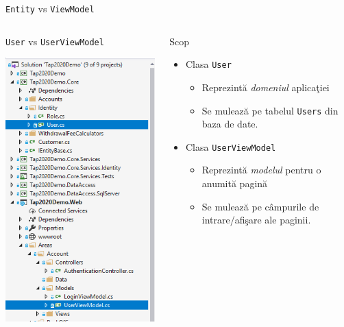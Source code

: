 \documentclass[presentation]{beamer}
\begin{document}
\begin{frame}[label={sec:org939da90},fragile]{\texttt{Entity} vs \texttt{ViewModel}}
 \begin{columns}
\begin{column}{0.4\columnwidth}
\begin{block}{\texttt{User} vs \texttt{UserViewModel}}
\begin{center}
\includegraphics[height=.8\textheight]{img/entity-vs-view-model.png}
\end{center}
\end{block}
\end{column}
\begin{column}{0.6\columnwidth}
\begin{block}{Scop}
\begin{itemize}
\item Clasa \texttt{User}
\begin{itemize}
\item Reprezintă \emph{domeniul} aplicaţiei
\item Se mulează pe tabelul \texttt{Users} din baza de date.
\end{itemize}
\item Clasa \texttt{UserViewModel}
\begin{itemize}
\item Reprezintă \emph{modelul} pentru o anumită pagină
\item Se mulează pe câmpurile de intrare/afişare ale paginii.
\end{itemize}
\end{itemize}
\end{block}
\end{column}
\end{columns}
\end{frame}
\end{document}

